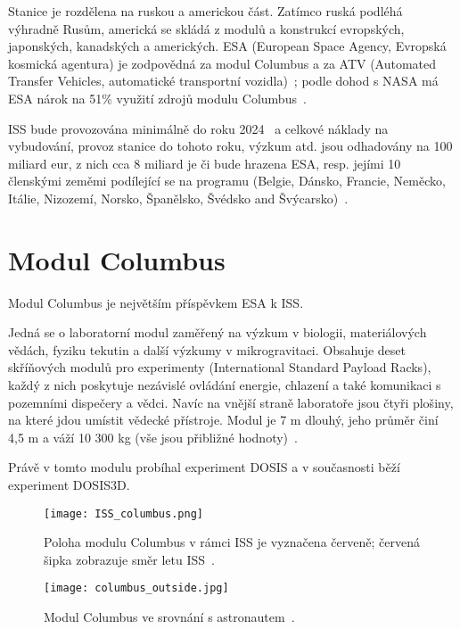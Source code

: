 Stanice je rozdělena na ruskou a americkou část. Zatímco ruská podléhá výhradně Rusům, americká se skládá z modulů a konstrukcí evropských, japonských, kanadských a amerických. ESA (European Space Agency, Evropská kosmická agentura) je zodpovědná za modul Columbus a za ATV (Automated Transfer Vehicles, automatické transportní vozidla)~\cite{ISS_about}; podle dohod s NASA má ESA nárok na 51\% využití zdrojů modulu Columbus~\cite{ISS_wiki}.

ISS bude provozována minimálně do roku 2024~\cite{ISS_prodlouzeni} a celkové náklady na vybudování, provoz stanice do tohoto roku, výzkum atd. jsou odhadovány na 100 miliard eur, z nich cca 8 miliard je či bude hrazena ESA, resp. jejími 10 členskými zeměmi podílející se na programu (Belgie, Dánsko, Francie, Neměcko, Itálie, Nizozemí, Norsko, Španělsko, Švédsko and Švýcarsko)~\cite{ISS_cost}.
\section{Modul Columbus}\label{sec:ISS_columbus}
Modul Columbus je největším příspěvkem ESA k ISS.

Jedná se o laboratorní modul zaměřený na výzkum v biologii, materiálových vědách, fyziku tekutin a další výzkumy v mikrogravitaci. Obsahuje deset skříňových modulů pro experimenty (International Standard Payload Racks), každý z nich poskytuje nezávislé ovládání energie, chlazení a také komunikaci s pozemními dispečery a vědci. Navíc na vnější straně laboratoře jsou čtyři plošiny, na které jdou umístit vědecké přístroje. Modul je 7 m dlouhý, jeho průměr činí 4,5 m a váží 10 300 kg (vše jsou přibližné hodnoty)~\cite{columbus}.

Právě v tomto modulu probíhal experiment DOSIS a v současnosti běží experiment DOSIS3D. 
\begin{figure}[H]
  \centering
  \texttt{[image: ISS\_columbus.png]}
  \caption{Poloha modulu Columbus v rámci ISS je vyznačena červeně; červená šipka zobrazuje směr letu ISS~\cite{dosis}.}
  \label{fig:columbus_poloha}
\end{figure}
\begin{figure}[H]
  \centering
  \texttt{[image: columbus\_outside.jpg]}
  \caption{Modul Columbus ve srovnání s astronautem~\cite{columbus_outside}.}
  \label{fig:columbus_srovnani}
\end{figure}

